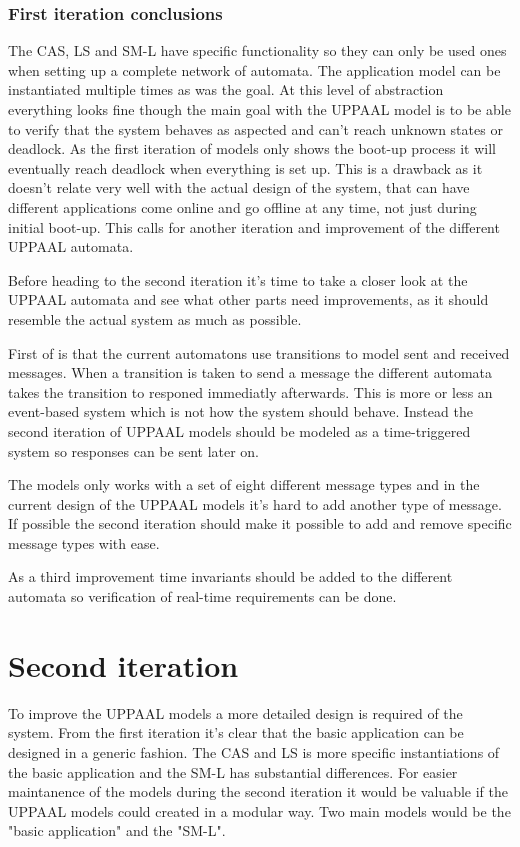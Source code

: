 \subsubsection{First iteration conclusions}
The CAS, LS and SM-L have specific functionality so they can only be used ones
when setting up a complete network of automata. The application model can be
instantiated multiple times as was the goal. At this level of abstraction
everything looks fine though the main goal with the UPPAAL model is to be able
to verify that the system behaves as aspected and can't reach unknown states or
deadlock. As the first iteration of models only shows the boot-up process it
will eventually reach deadlock when everything is set up. This is a drawback
as it doesn't relate very well with the actual design of the system, that can
have different applications come online and go offline at any time, not just
during initial boot-up. This calls for another iteration and improvement of the
different UPPAAL automata.

Before heading to the second iteration it's time to take a closer look at the
UPPAAL automata and see what other parts need improvements, as it should
resemble the actual system as much as possible.

First of is that the current automatons use transitions to model sent and
received messages. When a transition is taken to send a message the different
automata takes the transition to responed immediatly afterwards. This is more
or less an event-based system which is not how the system should behave.
Instead the second iteration of UPPAAL models should be modeled as a
time-triggered system so responses can be sent later on.

The models only works with a set of eight different message types and in the
current design of the UPPAAL models it's hard to add another type of message.
If possible the second iteration should make it possible to add and remove
specific message types with ease.

As a third improvement time invariants should be added to the different
automata so verification of real-time requirements can be done.

\section{Second iteration}
To improve the UPPAAL models a more detailed design is required of the system.
From the first iteration it's clear that the basic application can be designed
in a generic fashion. The CAS and LS is more specific instantiations of the
basic application and the SM-L has substantial differences. For easier
maintanence of the models during the second iteration it would be valuable if
the UPPAAL models could created in a modular way. Two main models would be the
"basic application" and the "SM-L".


